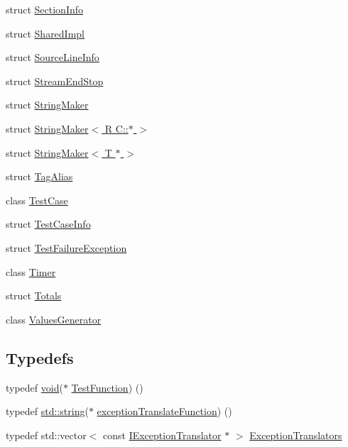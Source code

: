 \begin{DoxyCompactItemize}
\item 
struct \hyperlink{struct_catch_1_1_section_info}{Section\+Info}
\item 
struct \hyperlink{struct_catch_1_1_shared_impl}{Shared\+Impl}
\item 
struct \hyperlink{struct_catch_1_1_source_line_info}{Source\+Line\+Info}
\item 
struct \hyperlink{struct_catch_1_1_stream_end_stop}{Stream\+End\+Stop}
\item 
struct \hyperlink{struct_catch_1_1_string_maker}{String\+Maker}
\item 
struct \hyperlink{struct_catch_1_1_string_maker_3_01_r_01_c_1_1_5_01_4}{String\+Maker$<$ R C\+::$\ast$ $>$}
\item 
struct \hyperlink{struct_catch_1_1_string_maker_3_01_t_01_5_01_4}{String\+Maker$<$ T $\ast$ $>$}
\item 
struct \hyperlink{struct_catch_1_1_tag_alias}{Tag\+Alias}
\item 
class \hyperlink{class_catch_1_1_test_case}{Test\+Case}
\item 
struct \hyperlink{struct_catch_1_1_test_case_info}{Test\+Case\+Info}
\item 
struct \hyperlink{struct_catch_1_1_test_failure_exception}{Test\+Failure\+Exception}
\item 
class \hyperlink{class_catch_1_1_timer}{Timer}
\item 
struct \hyperlink{struct_catch_1_1_totals}{Totals}
\item 
class \hyperlink{class_catch_1_1_values_generator}{Values\+Generator}
\end{DoxyCompactItemize}
\subsection*{Typedefs}
\begin{DoxyCompactItemize}
\item 
typedef \hyperlink{_s_d_l__opengles2__gl2ext_8h_ae5d8fa23ad07c48bb609509eae494c95}{void}($\ast$ \hyperlink{namespace_catch_a26414f52d0835939fae52aadd27e6257}{Test\+Function}) ()
\item 
typedef \hyperlink{_s_d_l__opengl__glext_8h_ae84541b4f3d8e1ea24ec0f466a8c568b}{std\+::string}($\ast$ \hyperlink{namespace_catch_a14edb319150d3e108bbdef994f9eec2a}{exception\+Translate\+Function}) ()
\item 
typedef std\+::vector$<$ const \hyperlink{struct_catch_1_1_i_exception_translator}{I\+Exception\+Translator} $\ast$ $>$ \hyperlink{namespace_catch_ae0442a3627f91437716106138b5f540b}{Exception\+Translators}
\end{DoxyCompactItemize}
